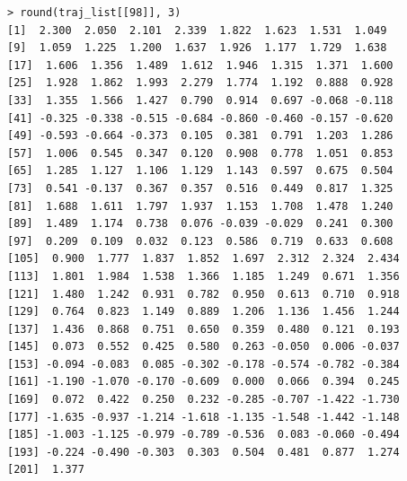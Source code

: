 \documentclass[14pt,a4paper]{scrartcl}
\begin{document}
\begin{verbatim}
> round(traj_list[[98]], 3)
[1]  2.300  2.050  2.101  2.339  1.822  1.623  1.531  1.049
[9]  1.059  1.225  1.200  1.637  1.926  1.177  1.729  1.638
[17]  1.606  1.356  1.489  1.612  1.946  1.315  1.371  1.600
[25]  1.928  1.862  1.993  2.279  1.774  1.192  0.888  0.928
[33]  1.355  1.566  1.427  0.790  0.914  0.697 -0.068 -0.118
[41] -0.325 -0.338 -0.515 -0.684 -0.860 -0.460 -0.157 -0.620
[49] -0.593 -0.664 -0.373  0.105  0.381  0.791  1.203  1.286
[57]  1.006  0.545  0.347  0.120  0.908  0.778  1.051  0.853
[65]  1.285  1.127  1.106  1.129  1.143  0.597  0.675  0.504
[73]  0.541 -0.137  0.367  0.357  0.516  0.449  0.817  1.325
[81]  1.688  1.611  1.797  1.937  1.153  1.708  1.478  1.240
[89]  1.489  1.174  0.738  0.076 -0.039 -0.029  0.241  0.300
[97]  0.209  0.109  0.032  0.123  0.586  0.719  0.633  0.608
[105]  0.900  1.777  1.837  1.852  1.697  2.312  2.324  2.434
[113]  1.801  1.984  1.538  1.366  1.185  1.249  0.671  1.356
[121]  1.480  1.242  0.931  0.782  0.950  0.613  0.710  0.918
[129]  0.764  0.823  1.149  0.889  1.206  1.136  1.456  1.244
[137]  1.436  0.868  0.751  0.650  0.359  0.480  0.121  0.193
[145]  0.073  0.552  0.425  0.580  0.263 -0.050  0.006 -0.037
[153] -0.094 -0.083  0.085 -0.302 -0.178 -0.574 -0.782 -0.384
[161] -1.190 -1.070 -0.170 -0.609  0.000  0.066  0.394  0.245
[169]  0.072  0.422  0.250  0.232 -0.285 -0.707 -1.422 -1.730
[177] -1.635 -0.937 -1.214 -1.618 -1.135 -1.548 -1.442 -1.148
[185] -1.003 -1.125 -0.979 -0.789 -0.536  0.083 -0.060 -0.494
[193] -0.224 -0.490 -0.303  0.303  0.504  0.481  0.877  1.274
[201]  1.377
\end{verbatim}
\end{document}
